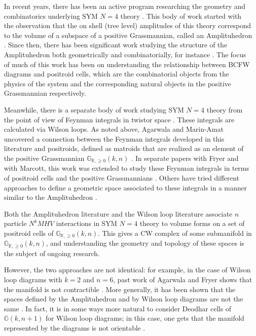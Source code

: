 \documentclass[11pt]{article}
\newcommand{\note}{\todo[color=green!40]}
\newcommand{\R}{\mathbb{R}}
\newcommand{\Gr}{\mathbb{G}_{\R, \geq 0}}
\theoremstyle{remark}
\theoremstyle{definition}
\begin{document}
In recent years, there has been an active program researching the geometry and combinatorics underlying SYM $N=4$ theory \cite{wilsonloop, Arkani-Hamed:2013jha, Amplituhedronsquared, galashinlam,AmplituhedronDecomposition}. This body of work started with the observation that the on shell (tree level) amplitudes of this theory correspond to the volume of a subspace of a positive Grassmannian, called an Amplituhedron \cite{Arkani-Hamed:2013jha}. Since then, there has been significant work studying the structure of the Amplituhedron both geometrically and combinatorially, for instance \cite{arkani:2012nw, Arkani-Hamed:2013kca, galashinlam,AmplituhedronDecomposition}. The focus of much of this work has been on understanding the relationship between BCFW diagrams and positroid cells, which are the combinatorial objects from the physics of the system and the corresponding natural objects in the positive Grassmannian respectively.

Meanwhile, there is a separate body of work studying SYM $N=4$ theory from the point of view of Feynman integrals in twistor space \cite{Adamo:2011pv, Britto:2005fq, Cachazo:2004kj}. These integrals are calculated via Wilson loops. As noted above, Agarwala and Marin-Amat uncovered a connection between the Feynman integrals developed in this literature and positroids, defined  as matroids that are realized as an element of the positive Grassmannian $\Gr(k,n)$ \cite{wilsonloop}. In separate papers with Fryer and with Marcott, this work was extended to study these Feynman integrals in terms of positroid cells and the positive Grassmannians \cite{casestudy, non-orientable}. Others have tried different approaches to define a geometric space associated to these integrals in a manner similar to the Amplituhedron \cite{Amplituhedronsquared, HeslopStewart}. 

Both the Amplituhedron literature and the Wilson loop literature associate $n$ particle $N^kMHV$ interactions in SYM $N=4$ theory to volume forms on a set of positroid cells of $\Gr(k,n)$. This gives a CW complex of some submanifold in $\Gr(k,n)$, and understanding the geometry and topology of these spaces is the subject of ongoing research. 

However, the two approaches are not identical: for example, in the case of Wilson loop diagrams with $k=2$ and $n=6$, past work of Agarwala and Fryer shows that the manifold is not contractible \cite{casestudy}. More generally, it has been shown that the spaces defined by the Amplituhedron and by Wilson loop diagrams are not the same \cite{Amplituhedronsquared}. In fact, it is in some ways more natural to consider Deodhar cells of $\mathbb{G}(k, n+1)$ for Wilson loop diagrams; in this case, one gets that the manifold represented by the diagrams is not orientable \cite{non-orientable}. \note{Check with Cam.}
\end{document}
